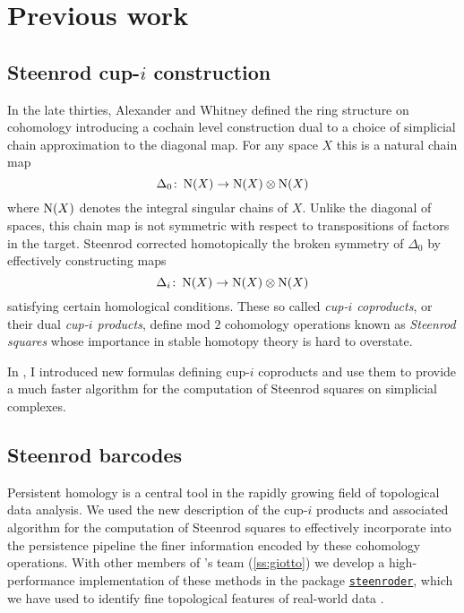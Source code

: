 \section{Previous work} \label{s:past}

\subsection{Steenrod cup-$i$ construction} \label{ss:cup-i}

In the late thirties, Alexander and Whitney defined the ring structure on cohomology introducing a cochain level construction dual to a choice of simplicial chain approximation to the diagonal map.
For any space $X$ this is a natural chain map
\[
\Delta_0 \colon \operatorname{N}(X) \to \operatorname{N}(X) \otimes \operatorname{N}(X)
\]
where $\operatorname{N}(X)$ denotes the integral singular chains of $X$.
Unlike the diagonal of spaces, this chain map is not symmetric with respect to transpositions of factors in the target.
Steenrod \cite{steenrod1947products} corrected homotopically the broken symmetry of $\Delta_0$ by effectively constructing maps
\begin{equation*}
\Delta_i \colon \operatorname{N}(X) \to \operatorname{N}(X) \otimes \operatorname{N}(X)
\end{equation*}
satisfying certain homological conditions.
These so called \textit{cup-$i$ coproducts}, or their dual \textit{cup-$i$ products}, define mod $2$ cohomology operations known as \textit{Steenrod squares} whose importance in stable homotopy theory is hard to overstate.

In \cite{medina2023fast_sq}, I introduced new formulas defining cup-$i$ coproducts and use them to provide a much faster algorithm for the computation of Steenrod squares on simplicial complexes.

\subsection{Steenrod barcodes}

Persistent homology is a central tool in the rapidly growing field of topological data analysis.
We used the new description of the cup-$i$ products and associated algorithm for the computation of Steenrod squares to effectively incorporate into the persistence pipeline the finer information encoded by these cohomology operations.
With other members of \giottoTDA's team (\cref{ss:giotto}) we develop a high-performance implementation of these methods in the package \href{https://steenroder.github.io/steenroder/}{\texttt{steenroder}}, which we have used to identify fine topological features of real-world data \cite{medina2022per_st}.

